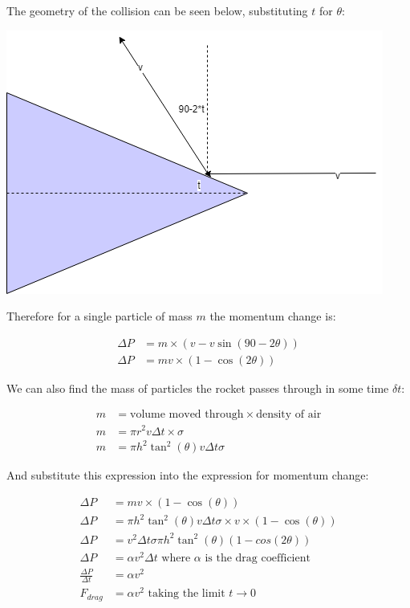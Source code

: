 \documentclass[]{article}
\begin{document}
The geometry of the collision can be seen below, substituting $t$ for $\theta$:

\begin{center}
	\includegraphics[scale=0.5]{collision.png}
\end{center}


Therefore for a single particle of mass $m$ the momentum change is:
\begin{center}
	\begin{align*}
	\Delta P &= m\times (v-v\sin(90-2\theta)) \\
	\Delta P &= mv\times(1-\cos(2\theta))
	\end{align*}
\end{center}

We can also find the mass of particles the rocket passes through in some time $\delta t$:

\begin{center}
	\begin{align*}
	m &= \text{volume moved through}\times \text{density of air} \\
	m &= \pi r^2 v \Delta t \times \sigma \\
	m &= \pi h^2 \tan^2(\theta) v \Delta t \sigma
	\end{align*}
\end{center}

And substitute this expression into the expression for momentum change:

\begin{center}
	\begin{align*}
	\Delta P &= mv\times(1-\cos(\theta)) \\
	\Delta P &= \pi h^2 \tan^2(\theta) v \Delta t \sigma \times v\times(1-\cos(\theta)) \\
	\Delta P &= v^2 \Delta t \sigma \pi h^2 \tan^2(\theta) (1-cos(2\theta)) \\
	\Delta P &= \alpha v^2 \Delta t \text{  where $\alpha$ is the drag coefficient} \\
	\frac{\Delta P}{\Delta t} &= \alpha v^2 \\
	F_{drag} &= \alpha v^2 \text{  taking the limit $t\rightarrow 0$}
	\end{align*}
\end{center}
\end{document}
